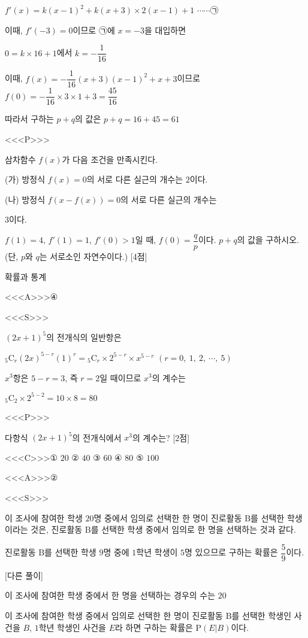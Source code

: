 \documentclass{oblivoir}
\begin{document}
$f'(x)=k(x-1)^{2}+k(x+3)\times 2(x-1)+1$ $\cdots\cdots$㉠

이때, $f'(-3)=0$이므로 ㉠에 $x= -3$을 대입하면

$0=k\times 16 +1$에서 $k= -\dfrac{1}{16}$

이때, $f(x)= -\dfrac{1}{16}(x+3)(x-1)^{2}+x+3$이므로 $f(0)= -\dfrac{1}{16}\times 3\times 1 +3 =\dfrac{45}{16}$

따라서 구하는 $p+q$의 값은 $p +q =16 +45 =61$

<<<P>>>

삼차함수 $f(x)$가 다음 조건을 만족시킨다.

(가) 방정식 $f(x)=0$의 서로 다른 실근의 개수는 $2$이다. 

(나) 방정식 $f(x-f(x))=0$의 서로 다른 실근의 개수는 

$3$이다.

$f(1)=4$, $f'(1)=1$, $f'(0)>1$일 때, $f(0)=\dfrac{q}{p}$이다. $p+q$의 값을 구하시오. (단, $p$와 $q$는 서로소인 자연수이다.) [4점]

확률과 통계

<<<A>>>④

<<<S>>>

$(2x+1)^{5}$의 전개식의 일반항은

${}_{5}\mathrm{C}_{r}(2x)^{5-r}(1)^{r}={}_{5}\mathrm{C}_{r}\times 2^{5-r}\times x^{5-r}$ $(r= 0,\:1,\:2,\:\cdots ,\:5)$

$x^{3}$항은 $5-r = 3$, 즉 $r=2$일 때이므로 $x^{3}$의 계수는

${}_{5}\mathrm{C}_{2}\times 2^{5-2}= 10\times 8 = 80$

<<<P>>>

다항식 $(2x+1)^{5}$의 전개식에서 $x^{3}$의 계수는? [2점]

<<<C>>>① $20$ ② $40$ ③ $60$ ④ $80$ ⑤ $100$

<<<A>>>②

<<<S>>>

이 조사에 참여한 학생 $20$명 중에서 임의로 선택한 한 명이 진로활동 $\mathrm{B}$를 선택한 학생이라는 것은, 진로활동 $\mathrm{B}$를 선택한 학생 중에서 임의로 한 명을 선택하는 것과 같다.

진로활동 $\mathrm{B}$를 선택한 학생 $9$명 중에 $1$학년 학생이 $5$명 있으므로 구하는 확률은 $\dfrac{5}{9}$이다.

[다른 풀이]

이 조사에 참여한 학생 중에서 한 명을 선택하는 경우의 수는 $20$

이 조사에 참여한 학생 중에서 임의로 선택한 한 명이 진로활동 $\mathrm{B}$를 선택한 학생인 사건을 $B$, $1$학년 학생인 사건을 $E$라 하면 구하는 확률은 $\mathrm{P}(E | B)$이다.
\end{document}
